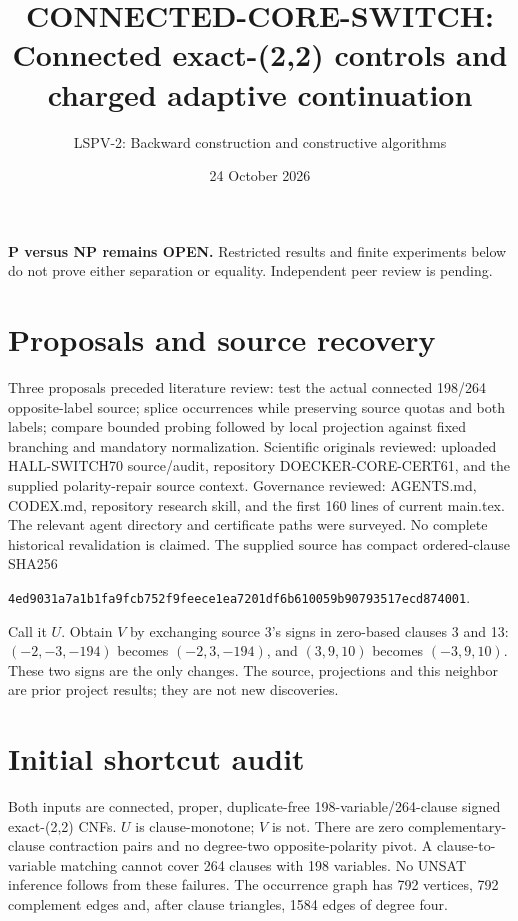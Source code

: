 \documentclass[11pt]{article}
\title{CONNECTED-CORE-SWITCH: Connected exact-(2,2) controls and charged adaptive continuation}
\author{LSPV-2: Backward construction and constructive algorithms}
\date{24 October 2026}
\begin{document}
\maketitle
\noindent\textbf{P versus NP remains OPEN.} Restricted results and finite experiments below do not prove either separation or equality. Independent peer review is pending.
\section{Proposals and source recovery}
Three proposals preceded literature review: test the actual connected 198/264 opposite-label source; splice occurrences while preserving source quotas and both labels; compare bounded probing followed by local projection against fixed branching and mandatory normalization. Scientific originals reviewed: uploaded HALL-SWITCH70 source/audit, repository DOECKER-CORE-CERT61, and the supplied polarity-repair source context. Governance reviewed: AGENTS.md, CODEX.md, repository research skill, and the first 160 lines of current main.tex. The relevant agent directory and certificate paths were surveyed. No complete historical revalidation is claimed.
The supplied source has compact ordered-clause SHA256
\begin{center}\scriptsize\texttt{4ed9031a7a1b1fa9fcb752f9feece1ea7201df6b610059b90793517ecd874001}.\end{center}
Call it $U$. Obtain $V$ by exchanging source 3's signs in zero-based clauses 3 and 13: $(-2,-3,-194)$ becomes $(-2,3,-194)$, and $(3,9,10)$ becomes $(-3,9,10)$. These two signs are the only changes. The source, projections and this neighbor are prior project results; they are not new discoveries.
\section{Initial shortcut audit}
Both inputs are connected, proper, duplicate-free 198-variable/264-clause signed exact-(2,2) CNFs. $U$ is clause-monotone; $V$ is not. There are zero complementary-clause contraction pairs and no degree-two opposite-polarity pivot. A clause-to-variable matching cannot cover 264 clauses with 198 variables. No UNSAT inference follows from these failures. The occurrence graph has 792 vertices, 792 complement edges and, after clause triangles, 1584 edges of degree four.
\end{document}

